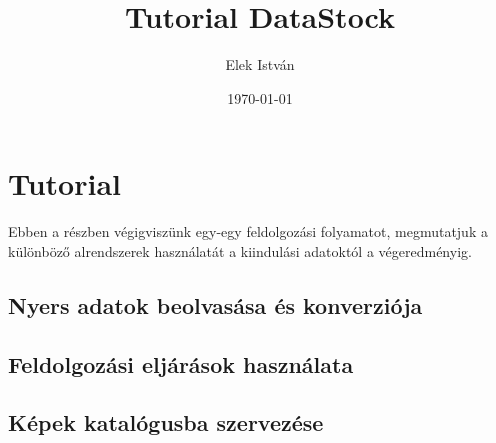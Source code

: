 \documentclass[a4paper,12pt]{article}
\begin{document}
	
	\author{Elek István}
	
	\title{Tutorial  \linebreak  \linebreak \small DataStock \linebreak \linebreak}
	
	
	\date{\today}
	
	
	\setcounter{tocdepth}{3}
	\maketitle
	\newpage
	\tableofcontents
	\newpage


\section{Tutorial}

Ebben a részben végigviszünk egy-egy feldolgozási folyamatot, megmutatjuk a különböző alrendszerek használatát a kiindulási adatoktól a végeredményig.

\subsection{Nyers adatok beolvasása és konverziója}

\subsection{Feldolgozási eljárások használata}

\subsection{Képek katalógusba szervezése}
\end{document}

